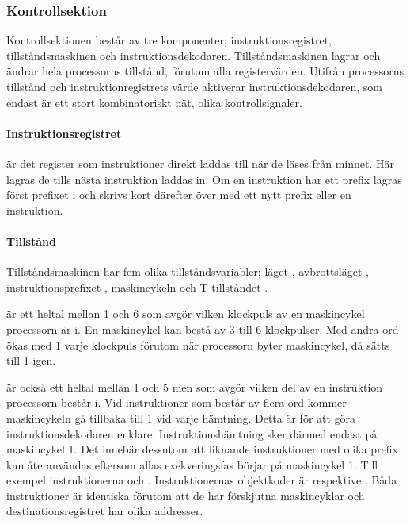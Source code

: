 \documentclass[main.tex]{subfiles}
\begin{document}
\subsubsection{Kontrollsektion}
Kontrollsektionen består av tre komponenter; instruktionsregistret,
tillståndsmaskinen och instruktionsdekodaren. Tillståndsmaskinen lagrar och
ändrar hela processorns tillstånd, förutom alla registervärden. Utifrån
processorns tillstånd och instruktionregistrets värde aktiverar
instruktionsdekodaren, som endast är ett stort kombinatoriskt nät, olika
kontrollsignaler.

\paragraph{Instruktionsregistret }
 är det register som instruktioner direkt laddas till när de läses
från minnet. Här lagras de tills nästa instruktion laddas in. Om en instruktion
har ett prefix lagras först prefixet i  och skrivs kort därefter över
med ett nytt prefix eller en instruktion.

\paragraph{Tillstånd}
Tillståndsmaskinen har fem olika tillståndsvariabler; läget ,
avbrottsläget , instruktionsprefixet , maskincykeln
 och T-tillståndet .

 är ett heltal mellan 1 och 6 som avgör vilken klockpuls av en
maskincykel processorn är i. En maskincykel kan bestå av 3 till 6 klockpulser.
Med andra ord ökas  med 1 varje klockpuls förutom när processorn byter
maskincykel, då sätts  till 1 igen.

 är också ett heltal mellan 1 och 5 men som avgör vilken del av en
instruktion processorn består i. Vid instruktioner som består av flera ord
kommer maskincykeln gå tillbaka till 1 vid varje hämtning. Detta är för att
göra instruktionsdekodaren enklare. Instruktionshämtning sker därmed endast på
maskincykel 1. Det innebär dessutom att liknande instruktioner med olika prefix
kan återanvändas eftersom allas exekveringsfas börjar på maskincykel 1. Till
exempel instruktionerna  och .
Instruktionernas objektkoder är  respektive . Båda instruktioner är
identiska förutom att de har förskjutna maskincyklar och destinationsregistret
har olika addresser.
\end{document}
